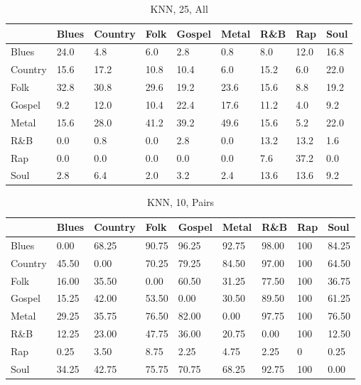 \documentclass[a4paper,oneside]{article}
\begin{document}
\begin{table}[H]
\caption{KNN, 25, All}
\begin{tabu}{l|*{8}{l}}
 & Blues & Country & Folk & Gospel & Metal & R\&B & Rap & Soul \\ \hline
Blues & 24.0 & 4.8 & 6.0 & 2.8 & 0.8 & 8.0 & 12.0 & 16.8 \\
Country & 15.6 & 17.2 & 10.8 & 10.4 & 6.0 & 15.2 & 6.0 & 22.0 \\
Folk & 32.8 & 30.8 & 29.6 & 19.2 & 23.6 & 15.6 & 8.8 & 19.2 \\
Gospel & 9.2 & 12.0 & 10.4 & 22.4 & 17.6 & 11.2 & 4.0 & 9.2 \\
Metal & 15.6 & 28.0 & 41.2 & 39.2 & 49.6 & 15.6 & 5.2 & 22.0 \\
R\&B & 0.0 & 0.8 & 0.0 & 2.8 & 0.0 & 13.2 & 13.2 & 1.6 \\
Rap & 0.0 & 0.0 & 0.0 & 0.0 & 0.0 & 7.6 & 37.2 & 0.0 \\
Soul & 2.8 & 6.4 & 2.0 & 3.2 & 2.4 & 13.6 & 13.6 & 9.2 \\
\end{tabu}
\end{table}

\begin{table}[H]
\caption{KNN, 10, Pairs}
\begin{tabu}{l|*{8}{l}}
 & Blues & Country & Folk & Gospel & Metal & R\&B & Rap & Soul \\ \hline
Blues & 0.00 & 68.25 & 90.75 & 96.25 & 92.75 & 98.00 & 100 & 84.25 \\
Country & 45.50 & 0.00 & 70.25 & 79.25 & 84.50 & 97.00 & 100 & 64.50 \\
Folk & 16.00 & 35.50 & 0.00 & 60.50 & 31.25 & 77.50 & 100 & 36.75 \\
Gospel & 15.25 & 42.00 & 53.50 & 0.00 & 30.50 & 89.50 & 100 & 61.25 \\
Metal & 29.25 & 35.75 & 76.50 & 82.00 & 0.00 & 97.75 & 100 & 76.50 \\
R\&B & 12.25 & 23.00 & 47.75 & 36.00 & 20.75 & 0.00 & 100 & 12.50 \\
Rap & 0.25 & 3.50 & 8.75 & 2.25 & 4.75 & 2.25 & 0 & 0.25 \\
Soul & 34.25 & 42.75 & 75.75 & 70.75 & 68.25 & 92.75 & 100 & 0.00 \\
\end{tabu}
\end{table}
\end{document}
